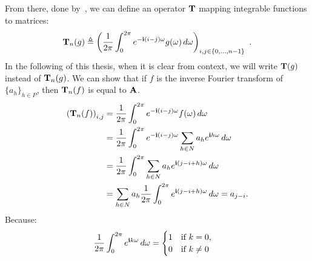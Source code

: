 From there,  done by~\citet{gray2006toeplitz}, we can define an operator $\mathbf{T}$ mapping integrable functions to matrices:
\begin{equation} \label{equation:ch2-toeplitz_operator}
  \Tmat_n(g) \triangleq \leftmat\frac{1}{2\pi}\int_{0}^{2\pi}e^{-\ci(i-j)\omega}g(\omega)\,d\omega\rightmat_{i,j\in\{0,\ldots,n-1\}} \enspace.
\end{equation}
\noindent
In the following of this thesis, when it is clear from context, we will write $\mathbf{T}(g)$ instead of $\mathbf{T}_n(g)$.
We can show that if $f$ is the inverse Fourier transform of $\{a_h\}_{h \in P}$, then $\mathbf{T}_n(f)$ is equal to $\mathbf{A}$.
\begingroup
\allowdisplaybreaks
  \begin{align}
      \leftmat \Tmat_n(f) \rightmat_{i, j} &= \frac{1}{2\pi} \int_0^{2\pi} e^{-\ci (i-j)\omega} f(\omega) \,d\omega  \\
      &= \frac{1}{2\pi} \int_0^{2\pi} e^{-\ci (i-j) \omega} \sum_{h \in N} a_h e^{\ci h \omega} \,d\omega  \\
      &= \frac{1}{2\pi} \int_0^{2\pi} \sum_{h \in N} a_h e^{\ci (j - i + h) \omega} \,d\omega  \\
      &= \sum_{h \in N} a_h \frac{1}{2\pi} \int_0^{2\pi} e^{\ci (j - i + h) \omega} \,d\omega 
      = a_{j-i} .
  \end{align}
\endgroup
Because:
\begin{equation}
  \frac{1}{2\pi} \int_0^{2\pi} e^{\mathbf{i} k \omega} \,d\omega = 
  \begin{cases}
    1 \quad \text{if}\ k = 0, \\
    0 \quad \text{if}\ k \neq 0
  \end{cases}
\end{equation}




